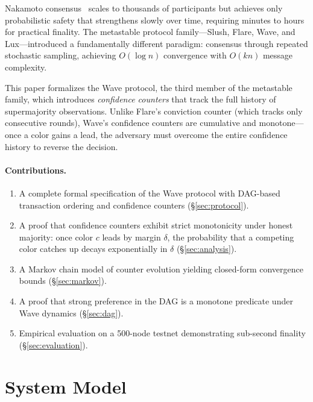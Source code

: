 \documentclass[11pt,a4paper]{article}
\begin{document}
Nakamoto consensus~\cite{nakamoto2008bitcoin} scales to thousands of participants but
achieves only probabilistic safety that strengthens slowly over time, requiring minutes
to hours for practical finality. The metastable protocol family---Slush, Flare, Wave,
and Lux---introduced a fundamentally different paradigm: consensus through repeated
stochastic sampling, achieving $O(\log n)$ convergence with $O(kn)$ message complexity.

This paper formalizes the Wave protocol, the third member of the metastable family,
which introduces \emph{confidence counters} that track the full history of supermajority
observations. Unlike Flare's conviction counter (which tracks only consecutive rounds),
Wave's confidence counters are cumulative and monotone---once a color gains a lead,
the adversary must overcome the entire confidence history to reverse the decision.

\paragraph{Contributions.}
\begin{enumerate}[nosep]
\item A complete formal specification of the Wave protocol with DAG-based transaction
ordering and confidence counters (\S\ref{sec:protocol}).
\item A proof that confidence counters exhibit strict monotonicity under honest majority:
once color $c$ leads by margin $\delta$, the probability that a competing color catches
up decays exponentially in $\delta$ (\S\ref{sec:analysis}).
\item A Markov chain model of counter evolution yielding closed-form convergence bounds
(\S\ref{sec:markov}).
\item A proof that strong preference in the DAG is a monotone predicate under Wave
dynamics (\S\ref{sec:dag}).
\item Empirical evaluation on a 500-node testnet demonstrating sub-second finality
(\S\ref{sec:evaluation}).
\end{enumerate}

\section{System Model}
\label{sec:model}
\end{document}
